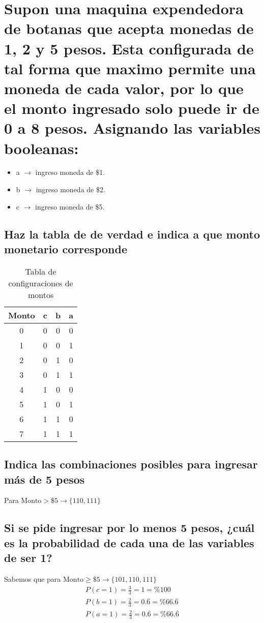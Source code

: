 \section{Supon una maquina expendedora de botanas que acepta monedas de 1, 2 y 5
pesos. Esta configurada de tal forma que maximo permite una moneda de cada
valor, por lo que el monto ingresado solo puede ir de 0 a 8 pesos. Asignando las
variables booleanas:}
\begin{itemize}
    \item \large a $\rightarrow$ ingreso moneda de \$1.
    \item \large b $\rightarrow$ ingreso moneda de \$2.
    \item \large c $\rightarrow$ ingreso moneda de \$5.
\end{itemize}

\subsection{Haz la tabla de de verdad e indica a que monto monetario corresponde}
\begin{table}[!ht]
    \centering
    \begin{tabular}{|c|c|c|c|}
        \hline
        Monto & c & b & a \\
        \hline
        0 & 0 & 0 & 0 \\
        \hline
        1 & 0 & 0 & 1 \\
        \hline
        2 & 0 & 1 & 0 \\
        \hline
        3 & 0 & 1 & 1 \\
        \hline
        4 & 1 & 0 & 0 \\
        \hline
        5 & 1 & 0 & 1 \\
        \hline
        6 & 1 & 1 & 0 \\
        \hline
        7 & 1 & 1 & 1 \\
        \hline
    \end{tabular}
    \caption{Tabla de configuraciones de montos}\label{table:montos}
\end{table}

\subsection{Indica las combinaciones posibles para ingresar más de 5 pesos}
Para $\text{Monto} > \mathdollar 5 \rightarrow \{110, 111\}$

\subsection{Si se pide ingresar por lo menos 5 pesos, ¿cuál es la probabilidad de cada una de las variables de ser 1?}
Sabemos que para $\text{Monto} \geq \mathdollar 5 \rightarrow \{101, 110, 111\}$
\begin{gather*}
    P(c = 1) = \frac{3}{3} = 1 = \%100\\
    P(b = 1) = \frac{2}{3} = 0.\overline{6} = \%66.\overline{6}\\
    P(a = 1) = \frac{2}{3} = 0.\overline{6} = \%66.\overline{6}\\
\end{gather*} 

